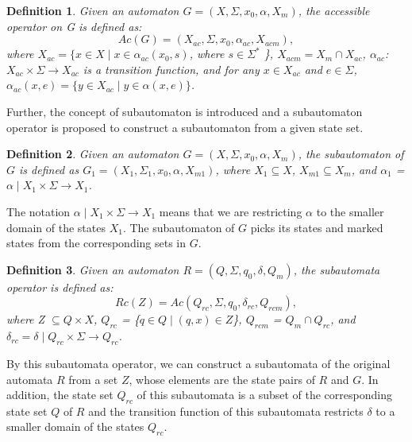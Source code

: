 \documentclass[12pt,draftcls,onecolumn]{IEEEtran}
\newtheorem{Definition}{Definition}
\begin{document}
\begin{Definition}
Given an automaton $G =(X,\Sigma,x_{0},\alpha,X_{m})$, the
accessible operator on G is defined as:
\[
Ac(G) = (X_{ac},\Sigma,x_{0},\alpha_{ac},X_{acm}),
\]
where $X_{ac} = \{ x \in X \mid  x \in \alpha_{ac}(x_0, s)$, where
$s \in \Sigma^{*}$ \}, $X_{acm} = X_m \cap X_{ac}$, $\alpha_{ac}$:
$X_{ac}\times \Sigma \rightarrow X_{ac}$ is a transition function,
and for any $x \in X_{ac}$ and $e \in \Sigma$, $\alpha_{ac}(x, e)
= \{y \in X_{ac} \mid y \in \alpha(x, e)\}$.
\end{Definition}


Further, the concept of subautomaton is introduced and a
subautomaton operator is proposed to construct a subautomaton from
a given state set.


\begin{Definition}
Given an automaton $G =(X,\Sigma,x_{0},\alpha,X_{m})$, the
subautomaton of $G$ is defined as $G_1 = (X_1, \Sigma_1, x_{0},
\alpha, X_{m1})$, where $X_1\subseteq X$, $X_{m1}\subseteq X_{m}$,
and $\alpha_{1}$ = $\alpha \mid X_{1}\times \Sigma \rightarrow
X_{1}$.
\end{Definition}
The notation $\alpha \mid X_{1}\times \Sigma \rightarrow X_{1}$
means that we are restricting $\alpha$ to the smaller domain of
the states $X_1$. The subautomaton of $G$ picks its states and
marked states from the corresponding sets in $G$.

\begin{Definition}
Given an automaton $R =(Q,\Sigma,q_{0},\delta,Q_{m})$, the
subautomata operator is defined as:
\[
Rc(Z) = Ac(Q_{rc},\Sigma,q_{0},\delta_{rc},Q_{rcm}),
\]
where Z $\subseteq Q \times X$, $Q_{rc}$ = \{$q \in Q \mid (q, x)
\in Z$\}, $Q_{rcm}$ = $Q_m \cap Q_{rc}$, and $\delta_{rc} = \delta
\mid Q_{rc} \times \Sigma \rightarrow Q_{rc}$.
\end{Definition}
By this subautomata operator, we can construct a subautomata of
the original automata $R$ from a set $Z$, whose elements are the
state pairs of $R$ and $G$. In addition, the state set $Q_{rc}$ of
this subautomata is a subset of the corresponding state set $Q$ of
$R$ and the transition function of this subautomata restricts
$\delta$ to a smaller domain of the states $Q_{rc}$.
\end{document}
